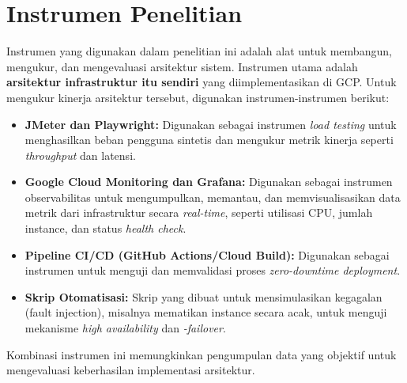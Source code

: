 \section{Instrumen Penelitian}
Instrumen yang digunakan dalam penelitian ini adalah alat untuk membangun, mengukur, dan mengevaluasi arsitektur sistem.
Instrumen utama adalah \textbf{arsitektur infrastruktur itu sendiri} yang diimplementasikan di GCP.
Untuk mengukur kinerja arsitektur tersebut, digunakan instrumen-instrumen berikut:
\begin{itemize}
    \item \textbf{JMeter dan Playwright:} Digunakan sebagai instrumen \textit{load testing} untuk menghasilkan beban pengguna sintetis dan mengukur metrik kinerja seperti \textit{throughput} dan latensi.
    \item \textbf{Google Cloud Monitoring dan Grafana:} Digunakan sebagai instrumen observabilitas untuk mengumpulkan, memantau, dan memvisualisasikan data metrik dari infrastruktur secara \textit{real-time}, seperti utilisasi CPU, jumlah instance, dan status \textit{health check}.
    \item \textbf{Pipeline CI/CD (GitHub Actions/Cloud Build):} Digunakan sebagai instrumen untuk menguji dan memvalidasi proses \textit{zero-downtime deployment}.
    \item \textbf{Skrip Otomatisasi:} Skrip yang dibuat untuk mensimulasikan kegagalan (fault injection), misalnya mematikan instance secara acak, untuk menguji mekanisme \textit{high availability} dan \textit{-failover}.
\end{itemize}
Kombinasi instrumen ini memungkinkan pengumpulan data yang objektif untuk mengevaluasi keberhasilan implementasi arsitektur.


